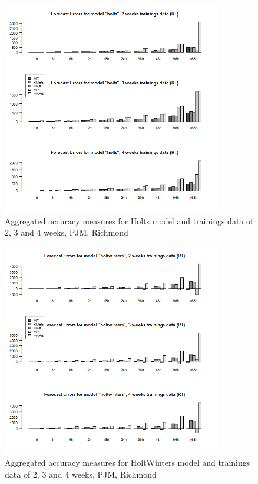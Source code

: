 \begin{figure}[!ht]
	\centering
		\includegraphics[width=0.85\textwidth]{figures/appendix_forecast_results/rt_sim_6_x_1w_1w_holts.png}
	\caption{Aggregated accuracy measures for Holts model and trainings data of 2, 3 and 4 weeks, PJM, Richmond}
	\label{fig:app_rt_sim_6_x_1w_1w_holts}
	\vspace*{-1.6in}
\end{figure}




\begin{figure}[!ht]
	\centering
	\vspace*{-1.2in}
		\includegraphics[width=0.85\textwidth]{figures/appendix_forecast_results/rt_sim_6_x_1w_1w_holtwinters.png}
	\caption{Aggregated accuracy measures for HoltWinters model and trainings data of 2, 3 and 4 weeks, PJM, Richmond}
	\label{fig:app_rt_sim_6_x_1w_1w_holtwinters}
\end{figure}

